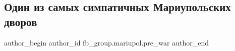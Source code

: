  
 
 
 
 

\subsection{Один из самых симпатичных Мариупольских дворов}
\label{sec:11_02_2023.fb.fb_group.mariupol.pre_war.1.odin_iz_samikh_simpa}

\ifcmt
 author_begin
   author_id fb_group.mariupol.pre_war
 author_end
\fi
